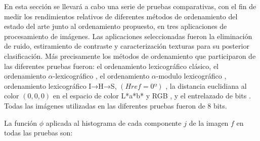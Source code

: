 En esta secci\'on se llevar\'a a cabo una serie de pruebas comparativas, con el fin de medir los rendimientos relativos de diferentes m\'etodos de ordenamiento del estado del arte junto al  ordenamiento propuesto, en tres aplicaciones de procesamiento de im\'agenes. Las aplicaciones seleccionadas fueron la eliminaci\'on de ruido, estiramiento de contraste y caracterización texturas para su posterior clasificación.
M\'as precisamente los m\'etodos de ordenamiento que participaron de las diferentes pruebas fueron:
el ordenamiento lexicogr\'afico cl\'asico, el ordenamiento $\alpha$-lexicogr\'afico \cite{zamora2001comparative}, el ordenamiento $\alpha$-modulo lexicogr\'afico \cite{angulo2003morphological}, ordenamiento lexicogr\'afico I→H→S, $(Href=0º)$ \cite{ortiz2004gaussian}, la distancia euclidiana al color $(0,0,0)$ en el espacio de color L*a*b* y RGB \cite{ortiz2002procesamiento}, y el entrelazado de bits \cite{chanussot1997bit}. 
Todas las im\'agenes utilizadas en las diferentes pruebas fueron de $8$ bits. 

La funci\'on $\phi$ aplicada al histograma de cada componente $j$ de la imagen $f$ en todas las pruebas son:

